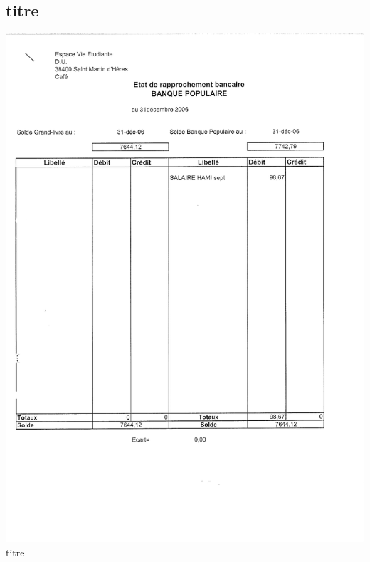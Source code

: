 \subsection{titre}
\begin{center}
\includegraphics[scale=0.6]{annexes/images/rapprochement_bancaire.pdf} \\
titre
\end{center}
